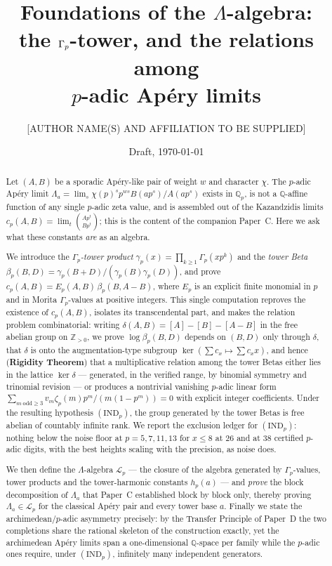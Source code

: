 \documentclass[11pt,reqno]{article}
\title{\bfseries Foundations of the $\Lambda$-algebra:\\
the $\Gp$-tower, and the relations among\\ $p$-adic Ap\'ery limits}
\author{[AUTHOR NAME(S) AND AFFILIATION TO BE SUPPLIED]}
\date{Draft, \today}
\newcommand{\Qp}{\mathbb{Q}_p}
\newcommand{\QQ}{\mathbb{Q}}
\newcommand{\ZZ}{\mathbb{Z}}
\newcommand{\Gp}{\Gamma_p}
\newcommand{\gtow}{\gamma_p}
\newcommand{\bet}{\beta_p}
\newcommand{\Lalg}{\mathcal{L}_p}
\newcommand{\bin}[2]{\binom{#1}{#2}}
\theoremstyle{plain}
\theoremstyle{definition}
\theoremstyle{remark}
\numberwithin{equation}{section}
\begin{document}
\maketitle

\begin{abstract}
Let $(A,B)$ be a sporadic Ap\'ery-like pair of weight $w$ and character $\chi$.
The $p$-adic Ap\'ery limit
$\Lambda_a=\lim_{s}\chi(p)^sp^{ws}B(ap^s)/A(ap^s)$ exists in $\Qp$, is not a
$\QQ$-affine function of any single $p$-adic zeta value, and is assembled out of
the Kazandzidis limits $c_p(A,B)=\lim_t\bin{Ap^t}{Bp^t}$; this is the content of
the companion Paper~C.  Here we ask what these constants \emph{are} as an
algebra.

We introduce the \emph{$\Gp$-tower product}
$\gtow(x)=\prod_{k\ge1}\Gp(xp^k)$ and the \emph{tower Beta}
$\bet(B,D)=\gtow(B+D)/(\gtow(B)\gtow(D))$, and prove
$c_p(A,B)=E_p(A,B)\,\bet(B,A-B)$, where $E_p$ is an explicit finite monomial in
$p$ and in Morita $\Gp$-values at positive integers.  This single computation
reproves the existence of $c_p(A,B)$, isolates its transcendental part, and
makes the relation problem combinatorial: writing
$\delta(A,B)=[A]-[B]-[A-B]$ in the free abelian group on $\ZZ_{>0}$, we prove
$\log\bet(B,D)$ depends on $(B,D)$ only through $\delta$, that $\delta$ is onto
the augmentation-type subgroup $\ker(\sum c_x\mapsto\sum c_xx)$, and hence
(\textbf{Rigidity Theorem}) that a multiplicative relation among the tower Betas
either lies in the lattice $\ker\delta$ --- generated, in the verified range, by
binomial symmetry and trinomial revision --- or produces a nontrivial vanishing
$p$-adic linear form
$\sum_{m\ \mathrm{odd}\ge3}v_m\zeta_p(m)p^m/(m(1-p^m))=0$ with explicit integer
coefficients.  Under the resulting hypothesis $(\mathrm{IND}_p)$, the group
generated by the tower Betas is free abelian of countably infinite rank.  We
report the exclusion ledger for $(\mathrm{IND}_p)$: nothing below the noise
floor at $p=5,7,11,13$ for $x\le8$ at $26$ and at $38$ certified $p$-adic
digits, with the best heights scaling with the precision, as noise does.

We then define the $\Lambda$-algebra $\Lalg$ --- the closure of the algebra
generated by $\Gp$-values, tower products and the tower-harmonic constants
$h_p(a)$ --- and \emph{prove} the block decomposition of $\Lambda_a$ that
Paper~C established block by block only, thereby proving $\Lambda_a\in\Lalg$ for
the classical Ap\'ery pair and every tower base $a$.  Finally we state the
archimedean/$p$-adic asymmetry precisely: by the Transfer Principle of Paper~D
the two completions share the rational skeleton of the construction exactly,
yet the archimedean Ap\'ery limits span a one-dimensional $\QQ$-space per family
while the $p$-adic ones require, under $(\mathrm{IND}_p)$, infinitely many
independent generators.
\end{abstract}
\end{document}

